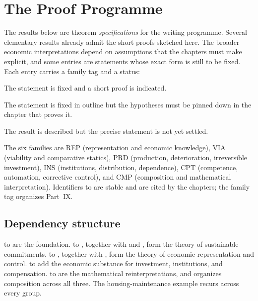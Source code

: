 \chapter*{The Proof Programme}

The results below are theorem \emph{specifications} for the writing programme. Several elementary results already admit the short proofs sketched here. The broader economic interpretations depend on assumptions that the chapters must make explicit, and some entries are statements whose exact form is still to be fixed. Each entry carries a family tag and a status:

\begin{description}[leftmargin=1.5em,style=nextline]
\item[Elementary] The statement is fixed and a short proof is indicated.
\item[Hypotheses to fix] The statement is fixed in outline but the hypotheses must be pinned down in the chapter that proves it.
\item[Specification] The result is described but the precise statement is not yet settled.
\end{description}

The six families are \textsc{REP} (representation and economic knowledge), \textsc{VIA} (viability and comparative statics), \textsc{PRD} (production, deterioration, irreversible investment), \textsc{INS} (institutions, distribution, dependence), \textsc{CPT} (competence, automation, corrective control), and \textsc{CMP} (composition and mathematical interpretation). Identifiers  to  are stable and are cited by the chapters; the family tag organizes Part~IX.

\section*{Dependency structure}

 to  are the foundation.  to , together with  and , form the theory of sustainable commitments.  to , together with , form the theory of economic representation and control.  to  add the economic substance for investment, institutions, and compensation.  to  are the mathematical reinterpretations, and  organizes composition across all three. The housing-maintenance example recurs across every group.

